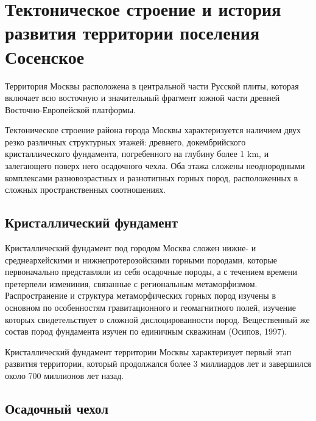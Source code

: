 \section{Тектоническое строение и история развития территории поселения Сосенское}\label{sec:ch2/sec2}

Территория Москвы расположена  в центральной части
Русской плиты, которая включает всю восточную и значительный фрагмент южной части древней
Восточно-Европейской платформы. 

Тектоническое строение района города Москвы характеризуется наличием двух резко различных
структурных этажей: древнего, докембрийского кристаллического фундамента, погребенного 
на глубину более 1 \si{\kilo\meter}, и залегающего поверх него осадочного чехла.
Оба этажа сложены неоднородными комплексами разновозрастных и разнотипных горных пород, 
расположенных в сложных пространственных соотношениях.

\subsection{Кристаллический фундамент}

Кристаллический фундамент под городом Москва сложен нижне- и среднеархейскими и 
нижнепротерозойскими горными породами, которые первоначально представляли из себя 
осадочные породы, а с течением времени претерпели измениния, связанные с региональным 
метаморфизмом. Распространение и структура метаморфических горных пород изучены в 
основном по особенностям гравитационного и геомагнитного полей, изучение которых свидетельствует 
о сложной дислоцированности пород. Вещественный же состав пород фундамента изучен по 
единичным скважинам (Осипов, 1997). 

Кристаллический фундамент территории Москвы характеризует первый этап развития территории,
который продолжался более 3 миллиардов лет и завершился около 700 миллионов лет назад.

\subsection{Осадочный чехол}

